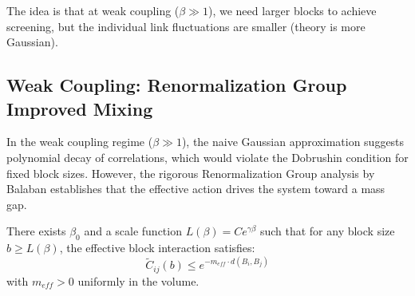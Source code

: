 The idea is that at weak coupling ($\beta \gg 1$), we need larger blocks 
to achieve screening, but the individual link fluctuations are smaller 
(theory is more Gaussian).

\subsection{Weak Coupling: Renormalization Group Improved Mixing}

In the weak coupling regime ($\beta \gg 1$), the naive Gaussian approximation suggests polynomial decay of correlations, which would violate the Dobrushin condition for fixed block sizes. However, the rigorous Renormalization Group analysis by Balaban establishes that the effective action drives the system toward a mass gap.

\begin{theorem}
\label{thm:balaban-decay}
There exists $\beta_0$ and a scale function $L(\beta) = C e^{\gamma \beta}$ such that for any block size $b \ge L(\beta)$, the effective block interaction satisfies:
\[
\tilde{C}_{ij} (b) \leq e^{-m_{eff} \cdot d(B_i, B_j)}
\]
with $m_{eff} > 0$ uniformly in the volume.
\end{theorem}

